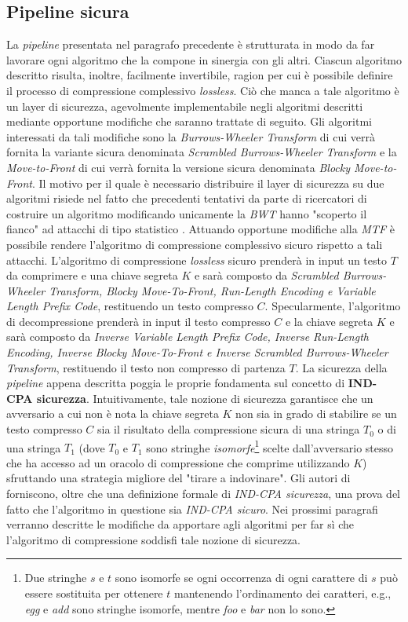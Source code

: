 \begin{enumerate}
\section{Pipeline sicura}
La \emph{pipeline} presentata nel paragrafo precedente è strutturata in modo da far lavorare ogni algoritmo che la compone in sinergia con gli altri. Ciascun algoritmo descritto risulta, inoltre, facilmente invertibile, ragion per cui è possibile definire il processo di compressione complessivo \emph{lossless}. Ciò che manca a tale algoritmo è un layer di sicurezza, agevolmente implementabile negli algoritmi descritti mediante opportune modifiche che saranno trattate di seguito. Gli algoritmi interessati da tali modifiche sono la \emph{Burrows-Wheeler Transform} di cui verrà fornita la variante sicura denominata \emph{Scrambled Burrows-Wheeler Transform} e la \emph{Move-to-Front} di cui verrà fornita la versione sicura denominata \emph{Blocky Move-to-Front}. Il motivo per il quale è necessario distribuire il layer di sicurezza su due algoritmi risiede nel fatto che precedenti tentativi da parte di ricercatori di costruire un algoritmo modificando unicamente la \emph{BWT} hanno "scoperto il fianco" ad attacchi di tipo statistico \cite{stanek2012attacking}. Attuando opportune modifiche alla \emph{MTF} è possibile rendere l'algoritmo di compressione complessivo sicuro rispetto a tali attacchi. L'algoritmo di compressione \emph{lossless} sicuro prenderà in input un testo $T$ da comprimere e una chiave segreta $K$ e sarà composto da \emph{Scrambled Burrows-Wheeler Transform, Blocky Move-To-Front, Run-Length Encoding e Variable Length Prefix Code}, restituendo un testo compresso $C$. Specularmente, l'algoritmo di decompressione prenderà in input il testo compresso $C$ e la chiave segreta $K$ e sarà composto da \emph{Inverse Variable Length Prefix Code, Inverse Run-Length Encoding, Inverse Blocky Move-To-Front e Inverse Scrambled Burrows-Wheeler Transform}, restituendo il testo non compresso di partenza $T$. La sicurezza della \emph{pipeline} appena descritta poggia le proprie fondamenta sul concetto di \textbf{IND-CPA sicurezza}. Intuitivamente, tale nozione di sicurezza garantisce che un avversario a cui non è nota la chiave segreta $K$ non sia in grado di stabilire se un testo compresso $C$ sia il risultato della compressione sicura di una stringa $T_0$ o di una stringa $T_1$ (dove $T_0$ e $T_1$ sono stringhe \emph{isomorfe}\footnote{Due stringhe $s$ e $t$ sono isomorfe se ogni occorrenza di ogni carattere di $s$ può essere sostituita per ottenere $t$ mantenendo l'ordinamento dei caratteri, e.g., \emph{egg} e \emph{add} sono stringhe isomorfe, mentre \emph{foo} e \emph{bar} non lo sono.} scelte dall'avversario stesso che ha accesso ad un oracolo di compressione che comprime utilizzando $K$) sfruttando una strategia migliore del "tirare a indovinare". Gli autori di \cite{zeng2018secure} forniscono, oltre che una definizione formale di \emph{IND-CPA sicurezza}, una prova del fatto che l'algoritmo in questione sia \emph{IND-CPA sicuro}. Nei prossimi paragrafi verranno descritte le modifiche da apportare agli algoritmi per far sì che l'algoritmo di compressione soddisfi tale nozione di sicurezza. 

\end{enumerate}
